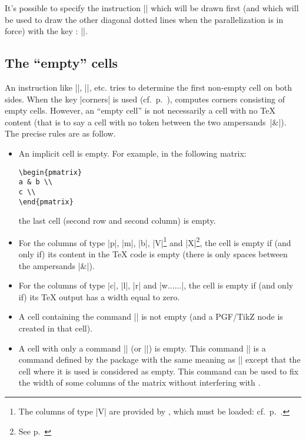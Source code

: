 \documentclass[dvipsnames]{article}%
\begin{document}
It's possible to specify the instruction |\Ddots| which will be drawn first
(and which will be used to draw the other diagonal dotted lines when the
parallelization is in force) with the key :
||. 

\subsection[The empty cells]{The ``empty'' cells}

\label{empty-cells}
An instruction like |\Ldots|, |\Cdots|, etc. tries to determine the first
non-empty cell on both sides. When the key |corners| is used
(cf.~p.~\pageref{corners}),  computes corners consisting of
empty cells. However, an ``empty cell'' is not necessarily a cell with no TeX
content (that is to say a cell with no token between the two ampersands~|&|).
The precise rules are as follow.

\begin{itemize}
\item An implicit cell is empty. For example, in the following matrix:

\begin{Verbatim}
\begin{pmatrix}
a & b \\
c \\
\end{pmatrix}
\end{Verbatim}

the last cell (second row and second column) is empty.

\medskip
\item For the columns of type |p|, |m|, |b|, |V|\footnote{The columns of type
  |V| are provided by , which must be loaded:
  cf.~p.~\pageref{varwidth}.} and |X|\footnote{See p.~\pageref{X-columns}}, the
cell is empty if (and only if) its content in the TeX code is empty (there is
only spaces between the ampersands |&|).

\medskip
\item For the columns of type |c|, |l|, |r| and |w{...}{...}|, the cell is
empty if (and only if) its TeX output has a width equal to zero.

\medskip
\item {}
A cell containing the command |\NotEmpty| is not empty (and a
PGF/TikZ node is created in that cell).

\medskip
\item A cell with only a command |\Hspace| (or |\Hspace*|) is empty. This
command |\Hspace| is a command defined by the package  with
the same meaning as |\hspace| except that the cell where it is used is
considered as empty. This command can be used to fix the width of some columns
of the matrix without interfering with .
\end{itemize}
\end{document}
